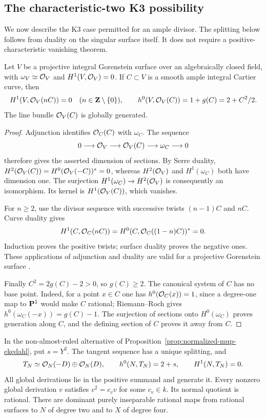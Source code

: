 \subsection{The characteristic-two K3 possibility}

We now describe the K3 case permitted for an ample divisor. The splitting
below follows from duality on the singular surface itself. It does
not require a positive-characteristic vanishing theorem.

\begin{lemma}\label{lem:k3-ample-curve-vanishing}
Let $V$ be a projective integral Gorenstein surface over an
algebraically closed field, with $\omega_V\simeq\mathcal O_V$ and
$H^1(V,\mathcal O_V)=0$. If $C\subset V$ is a smooth ample integral
Cartier curve, then
\[
 H^1(V,\mathcal O_V(nC))=0\quad(n\in\mathbf Z\setminus\{0\}),
 \qquad h^0(V,\mathcal O_V(C))=1+g(C)=2+C^2/2.
\]
The line bundle $\mathcal O_V(C)$ is globally generated.
\end{lemma}

\begin{proof}
Adjunction identifies $\mathcal O_C(C)$ with $\omega_C$. The sequence
\[
 0\longrightarrow\mathcal O_V\longrightarrow\mathcal O_V(C)
 \longrightarrow\omega_C\longrightarrow0
\]
therefore gives the asserted dimension of sections. By Serre
duality, $H^2(\mathcal O_V(C))=H^0(\mathcal O_V(-C))^*=0$, whereas
$H^2(\mathcal O_V)$ and $H^1(\omega_C)$ both have dimension one.
The surjection $H^1(\omega_C)\to H^2(\mathcal O_V)$ is consequently
an isomorphism. Its kernel is $H^1(\mathcal O_V(C))$, which vanishes.

For $n\geq2$, use the divisor sequence with successive twists
$(n-1)C$ and $nC$. Curve duality gives
\[
 H^1(C,\mathcal O_C(nC))=H^0(C,\mathcal O_C((1-n)C))^*=0.
\]
Induction proves the positive twists; surface duality proves the
negative ones. These applications of adjunction and duality are
valid for a projective Gorenstein surface
\cite[Tags 0AA4, 0FVZ and 0FW0]{Stacks}.

Finally $C^2=2g(C)-2>0$, so $g(C)\geq2$. The canonical system
of $C$ has no base point. Indeed, for a point $x\in C$ one has
$h^0(\mathcal O_C(x))=1$, since a degree-one map to $\mathbf P^1$ would
make $C$ rational; Riemann--Roch gives
$h^0(\omega_C(-x))=g(C)-1$. The surjection of sections onto
$H^0(\omega_C)$ proves generation along $C$, and the defining
section of $C$ proves it away from $C$.
\end{proof}

\begin{proposition}\label{prop:k3-picard-derivations}
In the non-almost-ruled alternative of
Proposition~\ref{prop:normalized-mup-ekedahl}, put $s=Y^2$.
The tangent sequence has a unique splitting, and
\[
 T_N\simeq\mathcal O_N(-D)\oplus\mathcal O_N(D),\qquad
 h^0(N,T_N)=2+s,\qquad H^1(N,T_N)=0.
\]
All global derivations lie in the positive summand and generate
it. Every nonzero global derivation $v$ satisfies $v^2=c_vv$ for
some $c_v\in k$. Its normal quotient is rational. There are
dominant purely inseparable rational maps from rational surfaces
to $N$ of degree two and to $X$ of degree four.
\end{proposition}


